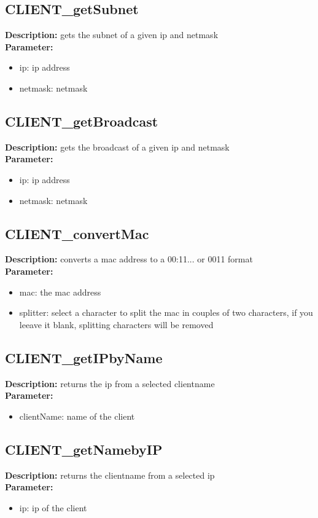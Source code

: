 \subsection{CLIENT\_getSubnet}
\textbf{Description:} gets the subnet of a given ip and netmask\\
\textbf{Parameter:}
\begin{itemize}
\item ip: ip address
\item netmask: netmask
\end{itemize}

\subsection{CLIENT\_getBroadcast}
\textbf{Description:} gets the broadcast of a given ip and netmask\\
\textbf{Parameter:}
\begin{itemize}
\item ip: ip address
\item netmask: netmask
\end{itemize}

\subsection{CLIENT\_convertMac}
\textbf{Description:} converts a mac address to a 00:11... or 0011 format\\
\textbf{Parameter:}
\begin{itemize}
\item mac: the mac address
\item splitter: select a character to split the mac in couples of two characters, if you leeave it blank, splitting characters will be removed
\end{itemize}

\subsection{CLIENT\_getIPbyName}
\textbf{Description:} returns the ip from a selected clientname\\
\textbf{Parameter:}
\begin{itemize}
\item clientName: name of the client
\end{itemize}

\subsection{CLIENT\_getNamebyIP}
\textbf{Description:} returns the clientname from a selected ip\\
\textbf{Parameter:}
\begin{itemize}
\item ip: ip of the client
\end{itemize}


